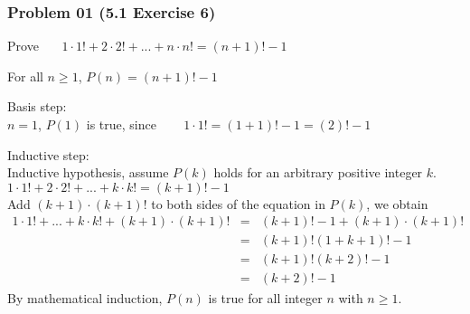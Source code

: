 \documentclass[14pt,hyperref={bookmarks=false}]{beamer}
\begin{document}
	\begin{frame}
	\frametitle{Problem 01 (5.1 Exercise 6)}
	\fontsize{10}{10pt}\selectfont
	Prove ~~~$1 · 1! + 2 · 2! + ... + n · n! = (n + 1)! - 1 $\\
    \vspace*{0.1cm}		

	For all $n \geq 1 $, $ P(n) = (n + 1)! - 1 $ \\
    \vspace*{0.1cm}	

	Basis step:\\
	$n = 1$, $ P(1) $ is true, since ~~~ $ 1 · 1! = (1 + 1)! - 1 = (2)! - 1 $ \\
	
    \vspace*{0.1cm}

	Inductive step:\\
    Inductive hypothesis, assume $ P(k) $ holds for an arbitrary positive integer $k$. ~~~  $1 · 1! + 2 · 2! + ... + k · k! = (k + 1)! - 1 $\\
    Add $ (k + 1) · (k + 1)!$ to both sides of the equation in $ P(k) $, we obtain
	\begin{eqnarray*}
	1 · 1!  + ... + k · k! + (k + 1) · (k + 1)!  & = & (k + 1)! - 1 + (k + 1) · (k + 1)!                  \\
	~ & = & (k + 1)!(1 + k + 1)! - 1\\
	~ & = & (k + 1)!(k + 2)! - 1\\
	~ & = & (k + 2)! - 1
	\end{eqnarray*}
	By mathematical induction, $ P(n) $ is true for all integer $n$ with $n \geq 1 $.
    
	\end{frame}
	
\end{document}
